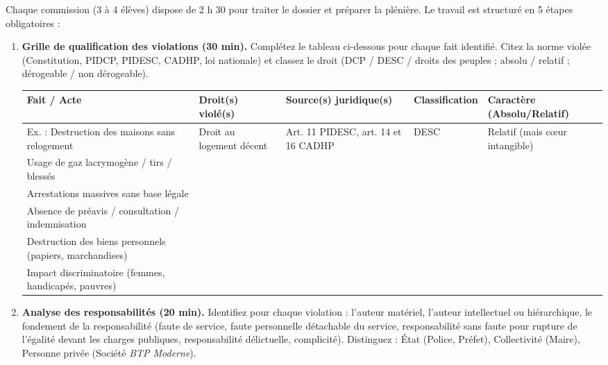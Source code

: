 \documentclass[11pt]{article}
\newcounter{popsec}
\newcounter{popsub}
\newcommand{\courssub}[1]{%
  \stepcounter{popsub}%
  \par\vspace{9pt}\noindent{\popxbold\fontsize{11.5}{13}\selectfont\color{popink}{\color{poporange}\thepopsec.\thepopsub}\hspace{6pt}#1}\par\nopagebreak\vspace{4pt}
}
\begin{document}
\courssub{Consignes}
\noindent Chaque commission (3 à 4 élèves) dispose de 2 h 30 pour traiter le dossier et préparer la plénière. Le travail est structuré en 5 étapes obligatoires :

\begin{enumerate}
    \item \textbf{Grille de qualification des violations (30 min).} Complétez le tableau ci-dessous pour chaque fait identifié. Citez la norme violée (Constitution, PIDCP, PIDESC, CADHP, loi nationale) et classez le droit (DCP / DESC / droits des peuples ; absolu / relatif ; dérogeable / non dérogeable).
    \begin{center}
    \begin{tabularx}{\linewidth}{|l|X|X|X|X|}\hline
    \textbf{Fait / Acte} & \textbf{Droit(s) violé(s)} & \textbf{Source(s) juridique(s)} & \textbf{Classification} & \textbf{Caractère (Absolu/Relatif)} \\ \hline
    Ex. : Destruction des maisons sans relogement & Droit au logement décent & Art. 11 PIDESC, art. 14 et 16 CADHP & DESC & Relatif (mais cœur intangible) \\ \hline
    Usage de gaz lacrymogène / tirs / blessés &  &  &  &  \\ \hline
    Arrestations massives sans base légale &  &  &  &  \\ \hline
    Absence de préavis / consultation / indemnisation &  &  &  &  \\ \hline
    Destruction des biens personnels (papiers, marchandises) &  &  &  &  \\ \hline
    Impact discriminatoire (femmes, handicapés, pauvres) &  &  &  &  \\ \hline
    \end{tabularx}
    \end{center}

    \item \textbf{Analyse des responsabilités (20 min).} Identifiez pour chaque violation : l'auteur matériel, l'auteur intellectuel ou hiérarchique, le fondement de la responsabilité (faute de service, faute personnelle détachable du service, responsabilité sans faute pour rupture de l'égalité devant les charges publiques, responsabilité délictuelle, complicité). Distinguez : État (Police, Préfet), Collectivité (Maire), Personne privée (Société \emph{BTP Moderne}).


\end{enumerate}
\end{document}
